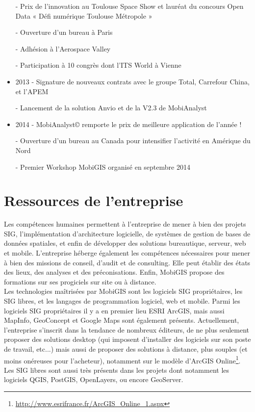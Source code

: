 \begin{itemize}
		- Prix de l'innovation au Toulouse Space Show et lauréat du concours Open Data « Défi numérique Toulouse Métropole » 
    
		- Ouverture d'un bureau à Paris 
    
		- Adhésion à l'Aerospace Valley 
    
		- Participation à 10 congrès dont l'ITS World à Vienne 
\\
\item 2013 
    - Signature de nouveaux contrats avec le groupe Total, Carrefour China, et l'APEM 
    
		- Lancement de la solution Anvio et de la V2.3 de MobiAnalyst 
\\
\item 2014
    - MobiAnalyst© remporte le prix de meilleure application de l'année !
    
		- Ouverture d'un bureau au Canada pour intensifier l'activité en Amérique du Nord
    
		- Premier Workshop MobiGIS organisé en septembre 2014 

\end{itemize}



\section{Ressources de l'entreprise}

Les compétences humaines permettent à l'entreprise de mener à bien des projets SIG, l'implémentation d'architecture logicielle, de systèmes de gestion de bases de données spatiales, et enfin de développer des solutions bureautique, serveur, web et mobile. 
L'entreprise héberge également les compétences nécessaires pour mener à bien des missions de conseil, d'audit et de consulting. Elle peut établir des états des lieux, des analyses et des préconisations. Enfin, MobiGIS propose des formations sur ses progiciels sur site ou à distance. \\

Les technologies maîtrisées par MobiGIS sont les logiciels SIG propriétaires, les SIG libres, et les langages de programmation logiciel, web et mobile. Parmi les logiciels SIG propriétaires il y a en premier lieu ESRI ArcGIS, mais aussi MapInfo, GeoConcept et Google Maps sont également présents. Actuellement, l'entreprise s'inscrit dans la tendance de nombreux éditeurs, de ne plus seulement proposer des solutions desktop (qui imposent d'installer des logiciels sur son poste de travail, etc...) mais aussi de proposer des solutions à distance, plus souples (et moins onéreuses pour l'acheteur), notamment sur le modèle d'ArcGIS Online\footnote{\url{http://www.esrifrance.fr/ArcGIS_Online_1.aspx}}. Les SIG libres sont aussi très présents dans les projets dont notamment les logiciels QGIS, PostGIS, OpenLayers, ou encore GeoServer. \\

